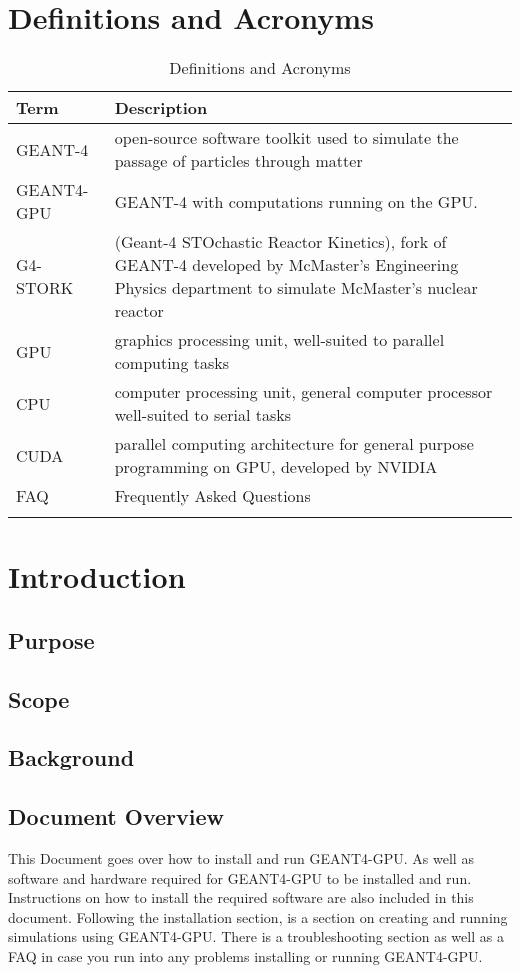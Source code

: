 \documentclass[12pt]{article}
\begin{document}
\section{Definitions and Acronyms} %
\begin{table}[h]
\centering
\caption{Definitions and Acronyms}
\begin{tabularx}{\textwidth}{l|X}
\Xhline{2\arrayrulewidth}
\bf Term & \bf Description\\
\hline
GEANT-4 & open-source software toolkit used to simulate the passage of particles through matter\\\hline
GEANT4-GPU & GEANT-4 with computations running on the GPU.\\\hline
G4-STORK & (Geant-4 STOchastic Reactor Kinetics), fork of GEANT-4 developed by McMaster's Engineering Physics department to simulate McMaster's nuclear reactor\\\hline
GPU & graphics processing unit, well-suited to parallel computing tasks\\\hline
CPU & computer processing unit, general computer processor well-suited to serial tasks\\\hline
CUDA & parallel computing architecture for general purpose programming on GPU, developed by NVIDIA\\\hline
FAQ & Frequently Asked Questions \\\hline
\Xhline{2\arrayrulewidth}
\end{tabularx}
\end{table}


\section{Introduction} %
\subsection{Purpose} %
\subsection{Scope} %
\subsection{Background} %
\subsection{Document Overview} %
This Document goes over how to install and run GEANT4-GPU. As well as software and hardware required for GEANT4-GPU to be installed and run. Instructions on how to install the required software 
are also included in this document. Following the installation section, is a section on creating and running simulations using GEANT4-GPU.  There is a troubleshooting section as well as a FAQ 
in case you run into any problems installing or running GEANT4-GPU.
\end{document}
